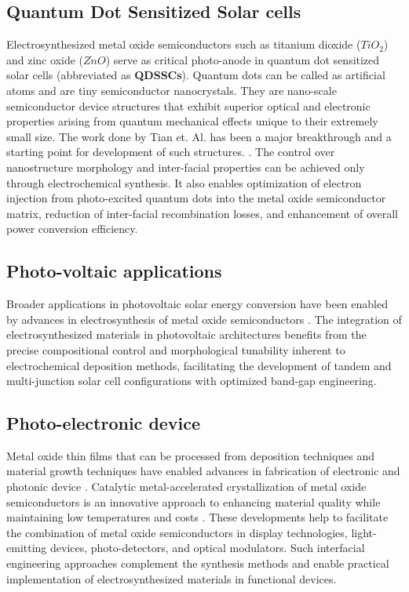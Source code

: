 \documentclass[12pt,a4paper]{report}
\begin{document}
	\subsection{Quantum Dot Sensitized Solar cells}
	Electrosynthesized metal oxide semiconductors such as titanium dioxide ($TiO_2$) and zinc oxide ($ZnO$) serve as critical photo-anode in quantum dot sensitized solar cells (abbreviated as \textbf{QDSSCs}). Quantum dots can be called as artificial atoms and are tiny semiconductor nanocrystals. They are nano-scale semiconductor device structures that exhibit superior optical and electronic properties arising from quantum mechanical effects unique to their extremely small size. The work done by Tian et. Al. has been a major breakthrough and a starting point for development of such structures. \cite{Tian2015}. The control over nanostructure morphology and inter-facial properties can be achieved only through electrochemical synthesis. It also enables optimization of electron injection from photo-excited quantum dots into the metal oxide semiconductor matrix, reduction of inter-facial recombination losses, and enhancement of overall power conversion efficiency. 
	
	\subsection{Photo-voltaic applications} 
	Broader applications in photovoltaic solar energy conversion have been enabled by advances in electrosynthesis of metal oxide semiconductors \cite{Rajeshwar2004}. The integration of electrosynthesized materials in photovoltaic architectures benefits from the precise compositional control and morphological tunability inherent to electrochemical deposition methods, facilitating the development of tandem and multi-junction solar cell configurations with optimized band-gap engineering.
	
	\subsection{Photo-electronic device}
	Metal oxide thin films that can be processed from deposition techniques and material growth techniques have enabled advances in fabrication of electronic and photonic device \cite{Hossein-Babaei2017}. Catalytic metal-accelerated crystallization of metal oxide semiconductors is an innovative approach to enhancing material quality while maintaining low temperatures and costs \cite{Chen2015}. These developments help to facilitate the combination of metal oxide semiconductors in display technologies, light-emitting devices, photo-detectors, and optical modulators. Such interfacial engineering approaches complement the synthesis methods and enable practical implementation of electrosynthesized materials in functional devices. 
	
\end{document}
